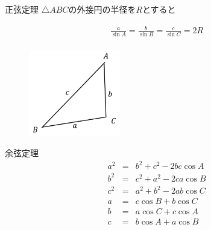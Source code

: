 \documentclass[aspectratio=169, 12pt]{beamer} %
\begin{document}
\begin{frame}{正弦定理}
    $\bigtriangleup ABC$の外接円の半径を$R$とすると\par
    \begin{eqnarray*}
        \frac{a}{\sin A}=\frac{b}{\sin B}=\frac{c}{\sin C}=2R \\
    \end{eqnarray*}
    \begin{figure}[htbp]
        \begin{center}
            \includegraphics[width=40mm]{fig/5.png}
        \end{center}
    \end{figure}

\end{frame}
\begin{frame}{余弦定理}
    \begin{eqnarray*}
        a^2&=&b^2+c^2-2bc\cos A \\
        b^2&=&c^2+a^2-2ca\cos B \\
        c^2&=&a^2+b^2-2ab\cos C \\
        a&=&c\cos B+ b\cos C \\
        b&=&a\cos C+ c\cos A \\
        c&=&b\cos A+a\cos B
    \end{eqnarray*}
\end{frame}
\end{document}

